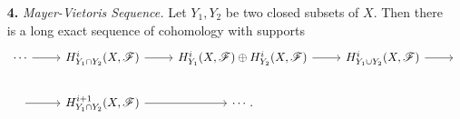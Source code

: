 \documentclass{article}
\newcommand{\fF}{\mathscr{F}}
\newcommand\restr[2]{{%
  \left.\kern-\nulldelimiterspace %
  #1 %
  \vphantom{\big|} %
  \right|_{#2} %
}}
\begin{document}
\begin{enumerate} [label=\textbf{\arabic*.}, leftmargin=0em]

    

\item[\textbf{4.}] \textit{Mayer-Vietoris Sequence.} Let $Y_1, Y_2$ be two closed subsets of $X$. Then there is a long exact sequence of cohomology with supports
\[ \begin{tikzcd}
    \cdots \arrow[r] & {H^i_{Y_1 \cap Y_2}(X, \fF)} \arrow[r]       & {H_{Y_1}^i(X, \fF) \oplus H_{Y_2}^i(X, \fF)} \arrow[r] & {H^i_{Y_1 \cup Y_2}(X, \fF)} \arrow[r] & {} \\
    {} \arrow[r]     & {H^{i + 1}_{Y_1 \cap Y_2}(X, \fF)} \arrow[r] & \cdots .                                               &                                        &   
\end{tikzcd} \] 


\end{enumerate}
\end{document}
